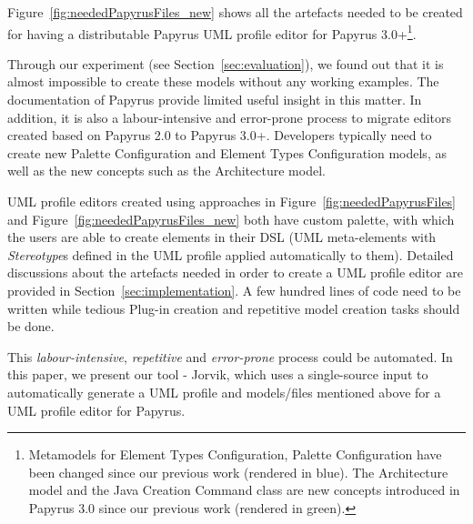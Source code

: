 Figure~\ref{fig:neededPapyrusFiles_new} shows all the artefacts needed to be created for having a distributable Papyrus UML profile editor for Papyrus 3.0+\footnote{Metamodels for Element Types Configuration, Palette Configuration have been changed since our previous work (rendered in blue). 
The Architecture model and the Java Creation Command class are new concepts introduced in Papyrus 3.0 since our previous work (rendered in green).}.

Through our experiment (see Section~\ref{sec:evaluation}), we found out that it is almost impossible to create these models without any working examples. 
The documentation of Papyrus provide limited useful insight in this matter.
In addition, it is also a labour-intensive and error-prone process to migrate editors created based on Papyrus 2.0 to Papyrus 3.0+. 
Developers typically need to create new Palette Configuration and Element Types Configuration models, as well as the new concepts such as the Architecture model.



UML profile editors created using approaches in Figure~\ref{fig:neededPapyrusFiles} and Figure~\ref{fig:neededPapyrusFiles_new} both have custom palette, with which the users are able to create elements in their DSL (UML meta-elements with \textit{Stereotype}s defined in the UML profile applied automatically to them).
Detailed discussions about the artefacts needed in order to create a UML profile editor are provided in Section~\ref{sec:implementation}.
A few hundred lines of code need to be written while tedious Plug-in creation and repetitive model creation tasks should be done.  

This \textit{labour-intensive}, \textit{repetitive} and \textit{error-prone} process could be automated. 
In this paper, we present our tool - Jorvik, which uses a single-source input to automatically generate a UML profile and models/files mentioned above for a UML profile editor for Papyrus. 
